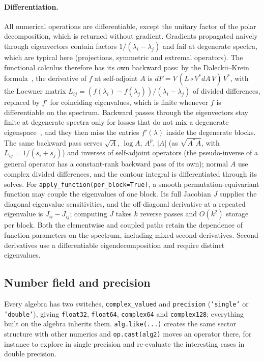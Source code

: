 \documentclass[11pt]{article}
\begin{document}
\paragraph{Differentiation.} All numerical operations are differentiable, except the unitary factor of the polar
decomposition, which is returned without gradient. Gradients propagated naively through eigenvectors
contain factors $1/(\lambda_i-\lambda_j)$ and fail at degenerate spectra, which are typical here (projections,
symmetric and extremal operators). The functional calculus therefore has its own backward pass: by the Daleckii--Krein
formula~\cite{daleckii1965,bhatia1997}, the derivative of $f$ at self-adjoint $A$ is $dF=V\,(L\circ V^*dA\,V)\,V^*$,
with the Loewner matrix $L_{ij}=(f(\lambda_i)-f(\lambda_j))/(\lambda_i-\lambda_j)$ of divided differences, replaced by
$f'$ for coinciding eigenvalues, which is finite whenever $f$ is differentiable on the spectrum. Backward passes through
the eigenvectors stay finite at degenerate spectra only for losses that do not mix a degenerate
eigenspace~\cite{kasim2020}, and they then miss the entries $f'(\lambda)$ inside the degenerate blocks. The same
backward pass serves $\sqrt A$, $\log A$, $A^p$, $|A|$ (as $\sqrt{A^*A}$, with $L_{ij}=1/(s_i+s_j)$) and inverses of
self-adjoint operators (the pseudo-inverse of a general operator has a constant-rank backward pass of its own);
normal $A$ use complex divided differences, and the contour integral is differentiated through its solves.
For \texttt{apply\_function(per\_block=True)}, a smooth permutation-equivariant function may couple the eigenvalues
of one block. Its full Jacobian $J$ supplies the diagonal eigenvalue sensitivities, and the off-diagonal derivative
at a repeated eigenvalue is $J_{ii}-J_{ij}$; computing $J$ takes $k$ reverse passes and $O(k^2)$ storage per block.
Both the elementwise and coupled paths retain the dependence of function parameters on the spectrum, including
mixed second derivatives. Second derivatives use a differentiable eigendecomposition and require distinct eigenvalues.

\subsection{Number field and precision}\label{sec:numerics}

Every algebra has two switches, \texttt{complex\_valued} and \texttt{precision} (\texttt{'single'} or
\texttt{'double'}), giving \texttt{float32}, \texttt{float64}, \texttt{complex64} and \texttt{complex128}; everything
built on the algebra inherits them. \texttt{alg.like(...)} creates the same sector structure with other numerics and
\texttt{op.cast(alg2)} moves an operator there, for instance to explore in single precision and re-evaluate the
interesting cases in double precision.
\end{document}
